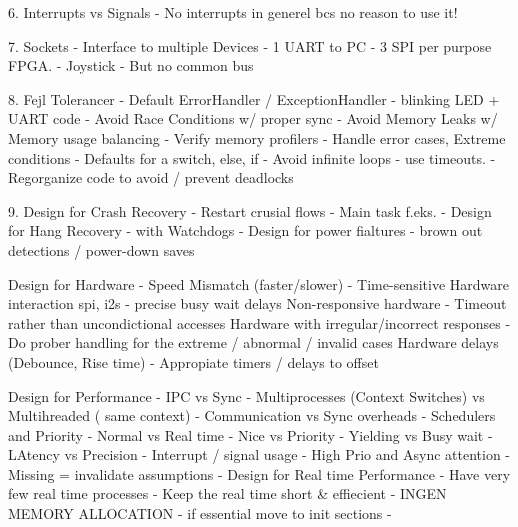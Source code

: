 \documentclass[11pt]{article}
\begin{document}
6. Interrupts vs Signals
    - No interrupts in generel bcs no reason to use it!

7. Sockets
- Interface to multiple Devices
    - 1 UART to PC
    - 3 SPI per purpose FPGA.
    - Joystick
        - But no common bus

8. Fejl Tolerancer
- Default ErrorHandler / ExceptionHandler
    - blinking LED + UART code
- Avoid Race Conditions w/ proper sync
- Avoid Memory Leaks w/ Memory usage balancing - Verify memory profilers
- Handle error cases, Extreme conditions
    - Defaults for a switch, else, if
- Avoid infinite  loops - use timeouts.
- Regorganize code to avoid / prevent deadlocks

9. Design for Crash Recovery
- Restart crusial flows - Main task f.eks.
- Design for Hang Recovery - with Watchdogs
- Design for power fialtures - brown out detections / power-down saves

Design for Hardware
- Speed Mismatch (faster/slower)
- Time-sensitive Hardware interaction spi, i2s - precise busy wait delays
Non-responsive hardware
- Timeout rather than uncondictional accesses
 Hardware with irregular/incorrect responses
- Do prober handling for the extreme / abnormal / invalid cases
Hardware delays (Debounce, Rise time)
- Appropiate timers / delays to offset

Design for Performance
- IPC vs Sync
    - Multiprocesses (Context Switches) vs Multihreaded ( same context)
    - Communication vs Sync overheads
- Schedulers and Priority
    - Normal vs Real time
    - Nice vs Priority
- Yielding vs Busy wait
    - LAtency vs Precision
- Interrupt / signal usage
    - High Prio and Async attention
    - Missing = invalidate assumptions
- Design for Real time Performance
- Have very few real time processes
- Keep the real time short \& effiecient
    - INGEN MEMORY ALLOCATION
    - if essential move to init sections
-
\newpage
%

\newpage
\printbibliography
\end{document}
